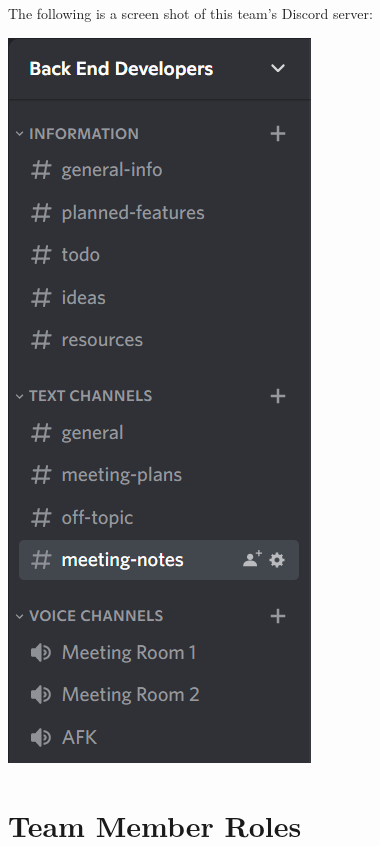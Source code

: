 \documentclass{article}
\begin{document}
The following is a screen shot of this team's Discord server:\\
\begin{center}
    \includegraphics{DiscordServer}
\end{center}

\section{Team Member Roles}
\end{document}
